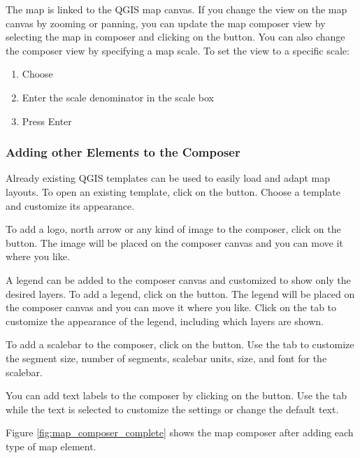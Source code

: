 The map is linked to the QGIS map canvas. If you change the view on the map
canvas by zooming or panning, you can update the map composer view by
selecting the map in composer and clicking on the  button.
You can also change the composer view by specifying a map scale. To set the
view to a specific scale:

\begin{enumerate}
\item Choose 
\item Enter the scale denominator in the scale box
\item Press Enter
\end{enumerate} 

\subsubsection{Adding other Elements to the Composer} 
 
Already existing QGIS templates can be used to easily load and adapt map
layouts. To open an existing template, click on the
button. Choose a template and
customize its appearance. 

To add a logo, north arrow or any  kind of image to the composer, click on
the 
button. The image will 
be placed on the composer canvas and you can move it where you like. 

A legend can be added to the composer canvas and customized to show only the
desired layers. To add a legend, click on the
button. The legend will be
placed on the composer canvas and you can move it where you like. Click on
the  tab to customize the appearance of the legend, including
which layers are shown.

To add a scalebar to the composer, click on the
button. Use the 
tab to customize the segment size, number of segments, scalebar units, size,
and font for the scalebar.

You can add text labels to the composer by clicking on the
button. Use the  tab
while the text is selected to customize the settings or change the default text.

Figure \ref{fig:map_composer_complete} shows the map composer after adding
each type of map element.

